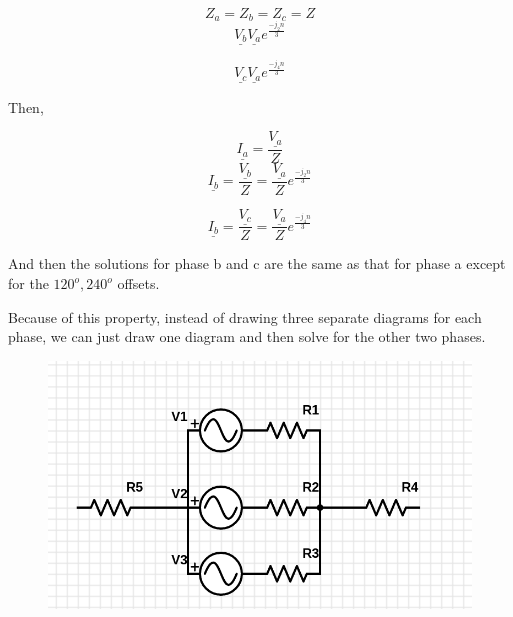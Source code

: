 \documentclass[../notes.tex]{subfiles}
\begin{document}
\begin{example}
	\begin{equation}
		Z_a = Z_b = Z_c = Z
	\end{equation}
	\begin{equation}
		\underline{V_b}
		\underline{V_a} e^{\frac{-j_2n}{3}}
	\end{equation}

	\begin{equation}
		\underline{V_c}
		\underline{V_a} e^{\frac{-j_4n}{3}}
	\end{equation}

	Then,

	\begin{equation}
		\underline{I_a} = \frac{\underline{V_a}}{Z}
	\end{equation}
	\begin{equation}
		\underline{I_b} = \frac{\underline{V_b}}{Z} = \frac{\underline{V_a}}{Z} e^{\frac{-j_2n}{3}}
	\end{equation}

	\begin{equation}
		\underline{I_b} = \frac{\underline{V_c}}{Z} = \frac{\underline{V_a}}{Z} e^{\frac{-j_4n}{3}}
	\end{equation}

	And then the solutions for phase b and c are the same as that for phase a except for the $ 120^o, 240^o$  offsets.
	
\end{example}


Because of this property, instead of drawing three separate diagrams for each phase, we can just draw one diagram and then solve for the other two phases.
\begin{figure}[H]
	\centering
	\includegraphics[width=0.8\linewidth]{img/image_2022-09-18-02-32-50.png}
\end{figure}
\end{document}
